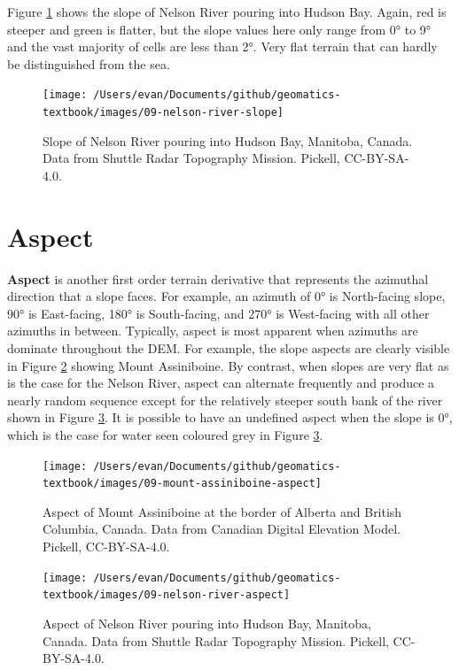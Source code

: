 \documentclass[
]{book}
\begin{document}
Figure \ref{fig:9-nelson-river-slope} shows the slope of Nelson River pouring into Hudson Bay. Again, red is steeper and green is flatter, but the slope values here only range from 0° to 9° and the vast majority of cells are less than 2°. Very flat terrain that can hardly be distinguished from the sea.

\begin{figure}
\texttt{[image: /Users/evan/Documents/github/geomatics-textbook/images/09-nelson-river-slope]} \caption{Slope of Nelson River pouring into Hudson Bay, Manitoba, Canada. Data from Shuttle Radar Topography Mission. Pickell, CC-BY-SA-4.0.}\label{fig:9-nelson-river-slope}
\end{figure}

\hypertarget{aspect}{%
\section{Aspect}\label{aspect}}

\textbf{Aspect} is another first order terrain derivative that represents the azimuthal direction that a slope faces. For example, an azimuth of 0° is North-facing slope, 90° is East-facing, 180° is South-facing, and 270° is West-facing with all other azimuths in between. Typically, aspect is most apparent when azimuths are dominate throughout the DEM. For example, the slope aspects are clearly visible in Figure \ref{fig:9-mount-assiniboine-aspect} showing Mount Assiniboine. By contrast, when slopes are very flat as is the case for the Nelson River, aspect can alternate frequently and produce a nearly random sequence except for the relatively steeper south bank of the river shown in Figure \ref{fig:9-nelson-river-aspect}. It is possible to have an undefined aspect when the slope is 0°, which is the case for water seen coloured grey in Figure \ref{fig:9-nelson-river-aspect}.

\begin{figure}
\texttt{[image: /Users/evan/Documents/github/geomatics-textbook/images/09-mount-assiniboine-aspect]} \caption{Aspect of Mount Assiniboine at the border of Alberta and British Columbia, Canada. Data from Canadian Digital Elevation Model. Pickell, CC-BY-SA-4.0.}\label{fig:9-mount-assiniboine-aspect}
\end{figure}

\begin{figure}
\texttt{[image: /Users/evan/Documents/github/geomatics-textbook/images/09-nelson-river-aspect]} \caption{Aspect of Nelson River pouring into Hudson Bay, Manitoba, Canada. Data from Shuttle Radar Topography Mission. Pickell, CC-BY-SA-4.0.}\label{fig:9-nelson-river-aspect}
\end{figure}
\end{document}
